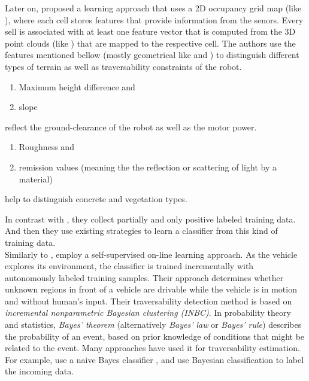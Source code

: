 \documentclass[12pt,a4paper,table,dvipsnames,tikz]{report}
\newcommand{\term}{\textit}
\newcommand{\acronym}{\MakeUppercase}
\begin{document}
	Later on, \citet{Suger} proposed a learning approach that uses a \acronym{2d} 
	occupancy grid map (like \citet{Shneier}), where each cell stores features that 
	provide information from the senors. Every sell is associated with at least one 
	feature vector that is computed from the \acronym{3d} point clouds (like 
	\citet{Lalonde}) that are mapped to the respective cell. The authors use the 
	features mentioned bellow (mostly geometrical like \citet{Lalonde} and 
	\citet{Pfaff}) to distinguish different types of terrain as well as 
	traversability constraints of the robot. 
	\begin{enumerate}
		\item Maximum height difference and
		\item slope 
	\end{enumerate}
	reflect the ground-clearance of the robot as well as the motor power.
	\begin{enumerate}
		\item Roughness and
		\item remission values (meaning the the reflection or scattering 
		of light by a material) 
	\end{enumerate}
	help to distinguish concrete and vegetation types.
	\par
	In contrast with \citet{Kim}, they collect partially and only positive labeled 
	training data. And then they use existing strategies \citep{Denis, Elkan} to 
	learn a classifier from this kind of training data.
	\\
	
	Similarly to \citet{Kim}, \citet{Lee} employ a self-supervised on-line learning 
	approach. As the vehicle explores its environment, the classifier is trained 
	incrementally with autonomously labeled training samples. Their approach 
	determines whether unknown regions in front of a vehicle are drivable while the 
	vehicle is in motion and without human’s input. Their traversability detection 
	method is based on \term{incremental nonparametric Bayesian clustering 
	(\acronym{inbc})}. In probability theory and statistics, \term{Bayes' theorem} 
	(alternatively \term{Bayes' law} or \term{Bayes' rule}) describes the probability 
	of an event, based on prior knowledge of conditions that might be related to the 
	event. Many approaches have used it for traversability estimation. For example, 
	\citet{Suger} use a naive Bayes classifier \citep{Denis}, and \citet{Lalonde} use 
	Bayesian classification to label the incoming data.
	\\
	
\end{document}
